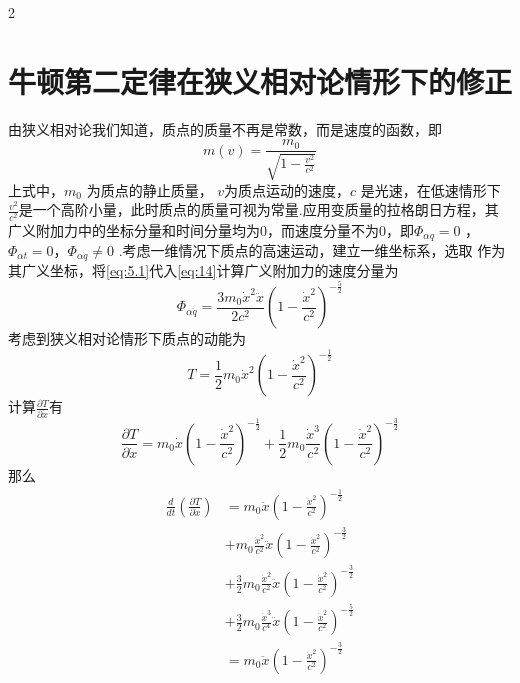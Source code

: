 \documentclass[12pt,twoside]{article}
\numberwithin{equation}{section}    %
\begin{document}
\begin{multicols}{2}
    \section{牛顿第二定律在狭义相对论情形下的修正}
    由狭义相对论我们知道，质点的质量不再是常数，而是速度的函数，即
    \begin{equation}
        m\left( v \right) =\frac{m_0}{\sqrt{1-\frac{v^2}{c^2}}}
        \label{eq:5.1}
    \end{equation}
    上式中，$m_0$ 为质点的静止质量， $v$为质点运动的速度，$c$ 是光速，在低速情形下 $\frac{v^2}{c^2}$是一个高阶小量，此时质点的质量可视为常量.应用变质量的拉格朗日方程，其广义附加力中的坐标分量和时间分量均为0，而速度分量不为0，即$\varPhi _{\alpha q}=0$ ， $\varPhi _{\alpha t}=0$，$\varPhi _{\alpha \dot{q}}\ne 0$ .考虑一维情况下质点的高速运动，建立一维坐标系，选取 作为其广义坐标，将\eqref{eq:5.1}代入\eqref{eq:14}计算广义附加力的速度分量为
    \begin{equation}
        \varPhi _{\alpha \dot{q}}=\frac{3m_0\dot{x}^2\ddot{x}}{2c^2}\left( 1-\frac{\dot{x}^2}{c^2} \right) ^{-\frac{5}{2}}
        \label{eq:5.2}
    \end{equation}
    考虑到狭义相对论情形下质点的动能为
    \begin{equation}
        T=\frac{1}{2}m_0\dot{x}^2\left( 1-\frac{\dot{x}^2}{c^2} \right) ^{-\frac{1}{2}}
        \label{eq:5.3}
    \end{equation}
    计算$\frac{\partial T}{\partial \dot{x}}$有
    \[
        \frac{\partial T}{\partial \dot{x}}=m_0\dot{x}\left( 1-\frac{\dot{x}^2}{c^2} \right) ^{-\frac{1}{2}}+\frac{1}{2}m_0\frac{\dot{x}^3}{c^2}\left( 1-\frac{\dot{x}^2}{c^2} \right) ^{-\frac{3}{2}}
    \]  
    那么
    \[
        \begin{split}
            \frac{d}{dt}\left( \frac{\partial T}{\partial \dot{x}} \right) &=m_0\ddot{x}\left( 1-\frac{\dot{x}^2}{c^2} \right) ^{-\frac{1}{2}}
            \\
            &+m_0\frac{\dot{x}^2}{c^2}\ddot{x}\left( 1-\frac{\dot{x}^2}{c^2} \right) ^{-\frac{3}{2}}
            \\
            &+\frac{3}{2}m_0\frac{\dot{x}^2}{c^2}\ddot{x}\left( 1-\frac{\dot{x}^2}{c^2} \right) ^{-\frac{3}{2}}
            \\
            &+\frac{3}{2}m_0\frac{\dot{x}^3}{c^4}\ddot{x}\left( 1-\frac{\dot{x}^2}{c^2} \right) ^{-\frac{5}{2}}
            \\
            &=m_0\ddot{x}\left( 1-\frac{\dot{x}^2}{c^2} \right) ^{-\frac{3}{2}}
            \\

\end{split}\]
\end{multicols}
\end{document}
